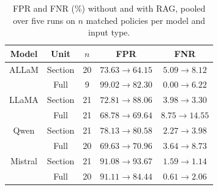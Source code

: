 \begin{table}[t]
\centering\footnotesize
\setlength{\tabcolsep}{2pt}
\caption{FPR and FNR (\%) without and with RAG, pooled over five runs on $n$ matched policies per model and input type.}
\label{tab:rag_errors}
\begin{tabular}{ccccc}
\toprule
Model & Unit & $n$ & FPR & FNR \\
\midrule
ALLaM & Section & 20 & $73.63\rightarrow64.15$ & $5.09\rightarrow8.12$ \\
 & Full & 9 & $99.02\rightarrow82.30$ & $0.00\rightarrow6.22$ \\
\midrule
LLaMA & Section & 21 & $72.81\rightarrow88.06$ & $3.98\rightarrow3.30$ \\
 & Full & 21 & $68.78\rightarrow69.64$ & $8.75\rightarrow14.55$ \\
\midrule
Qwen & Section & 21 & $78.13\rightarrow80.58$ & $2.27\rightarrow3.98$ \\
 & Full & 20 & $69.63\rightarrow70.96$ & $3.64\rightarrow8.73$ \\
\midrule
Mistral & Section & 21 & $91.08\rightarrow93.67$ & $1.59\rightarrow1.14$ \\
 & Full & 20 & $91.11\rightarrow84.44$ & $0.61\rightarrow2.06$ \\
\bottomrule
\end{tabular}
\end{table}